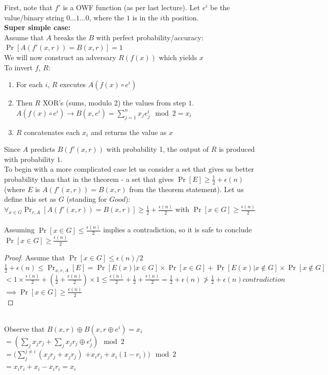 \documentclass[12pt]{tufte-book}
\begin{document}
	First, note that $f'$ is a OWF function (as per last lecture).  Let $e^i$ be the value/binary string $0\ldots1\ldots0$, where the $1$ is in the $i$th position.\\

\textbf{Super simple case:}\\
	Assume that $A$ breaks the $B$ with perfect probability/accuracy: $\Pr[A(f'(x,r)) = B(x,r)] = 1$\\
	We will now construct an adversary $R(f(x))$ which yields $x$\\
	To invert $f$, $R$:
	\begin{enumerate}
		\item For each $i$, $R$ executes $A(f(x) \circ e^i)$
		\item Then $R$ XOR's (sums, modulo 2) the values from step $1$.  $A(f(x) \circ e^i) \rightarrow B(x, e^i) = \sum_{j=1}^n x_j e_j^i \mod 2  = x_i$
		\item $R$ concatenates each $x_i$ and returns the value as $x$
	\end{enumerate}
	Since $A$ predicts $B(f'(x,r))$ with probability 1, the output of $R$ is produced with probability $1$.\\

To begin with a more complicated case let us consider a set that gives us better probability than that in the theorem - a set that gives $\Pr[E] \ge \frac{1}{2} + \epsilon(n)$ (where $E$ is $A(f'(x,r)) = B(x,r)$ from the theorem statement).
Let us define this set as $G$ (standing for $Good$):\\
$\forall_{x \in G} \Pr_{r,A}[A(f'(x,r)) = B(x,r)] \ge \frac{1}{2} + \frac{\epsilon(n)}{2}$ with $\Pr[x \in G] \ge \frac{\epsilon(n)}{2}$ \\
\\
Assuming $\Pr[x \in G] \le \frac{\epsilon(n)}{2}$ implies a contradiction, so it is safe to conclude $\Pr[x \in G] \ge \frac{\epsilon(n)}{2}$\\
\begin{proof}
Assume that $\Pr[x \in G] \le \epsilon(n)/2$\\
$\frac{1}{2}+\epsilon(n) \le \Pr_{x,r,A}[E] = \Pr[E(x) | x \in G] \times \Pr[x \in G] + \Pr[E(x) | x \notin G] \times \Pr[x \notin G]$\\
$< 1 \times \frac{\epsilon(n)}{2} + (\frac{1}{2}+\frac{\epsilon(n)}{2}) \times 1 \le \frac{\epsilon(n)}{2} + \frac{1}{2}+\frac{\epsilon(n)}{2} = \frac{1}{2}+ \epsilon(n) \not> \frac{1}{2}+ \epsilon(n) contradiction$\\
$\implies \Pr[x \in G] \ge \frac{\epsilon(n)}{2}$\\
\end{proof}
\\
	Observe that $B(x,r) \oplus B(x, r\oplus e^i) = x_i$\\
	$= (\sum_j x_j r_j + \sum_j x_j r_j \oplus e^i_j) \mod 2$\\
	$= (\sum_j^{j \not= i} (x_j r_j + x_j r_j)$  $+ x_i r_i + x_i (1-r_i)) \mod 2$\\
	$= x_i r_i + x_i - x_i r_i = x_i$\\\\
\end{document}
